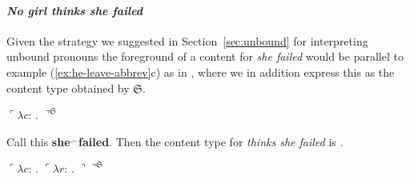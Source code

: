 \paragraph{\textit{No girl thinks she failed}}
\label{sec:direct-binding}

Given the strategy we suggested in Section~\ref{sec:unbound} for
interpreting unbound pronouns  the foreground of a content for
\textit{she failed} would be parallel to example
(\ref{ex:he-leave-abbrev}c) as in \nexteg{}, where we in addition
express this as the content type obtained by $\mathfrak{S}$.
\begin{ex}
  

$\ulcorner\lambda c$:
  . 
         $\urcorner^{\mathfrak{S}}$

\end{ex} 
Call this \textbf{she$^\frown$failed}.  Then the 
content type for \textit{thinks she failed} is \nexteg{}.
\begin{ex}
  $\ulcorner\lambda c$:
              . $\ulcorner\lambda r$: . 
              $\urcorner\urcorner^{\mathfrak{S}}$
\label{ex:thinks-she-failed-x0} 
\end{ex} 
